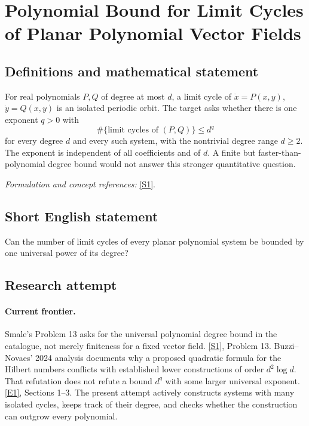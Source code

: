 \documentclass[11pt,a4paper]{article}
\newcommand{\sref}[2]{\hyperlink{source:#1:#2}{[S#2]}}
\newcommand{\eref}[2]{\hyperlink{extra:#1:#2}{[E#2]}}
\newif\ifshowcatalogue
\newcommand{\cataloguescope}[1]{\ifshowcatalogue
 \paragraph{Exact scope in the supplied catalogue.}
 \begin{quote}\small #1\end{quote}\fi}
\numberwithin{equation}{section}
\begin{document}
\setcounter{section}{0}
\setlength{\parskip}{3pt plus 1pt}
\clearpage
\section*{\texorpdfstring{Polynomial Bound for Limit Cycles of Planar Polynomial Vector Fields}{Polynomial Bound for Limit Cycles of Planar Polynomial Vector Fields}}\label{statement}
\subsection{Definitions and mathematical statement}
For real polynomials $P,Q$ of degree at most $d$, a limit cycle of $\dot x=P(x,y)$, $\dot y=Q(x,y)$ is an isolated periodic orbit. The target asks whether there is one exponent $q>0$ with
\[
 \#\{\text{limit cycles of }(P,Q)\}\le d^q
\]
for every degree $d$ and every such system, with the nontrivial degree range $d\ge2$. The exponent is independent of all coefficients and of $d$. A finite but faster-than-polynomial degree bound would not answer this stronger quantitative question.
\par\smallskip\textit{Formulation and concept references:} \sref{statement}{1}.
\cataloguescope{Determine whether the number K of limit cycles of every planar polynomial differential system of degree at most d satisfies K \ensuremath{\le} d\textasciicircum{}q for some universal exponent q.}
\subsection{Short English statement}
Can the number of limit cycles of every planar polynomial system be bounded by one universal power of its degree?
\subsection{Research attempt}

\paragraph{Current frontier.}
Smale's Problem 13 asks for the universal polynomial degree bound in the
catalogue, not merely finiteness for a fixed vector field.
\sref{statement}{1}, Problem 13.
Buzzi--Novaes' 2024 analysis documents why a proposed quadratic formula
for the Hilbert numbers conflicts with established lower constructions
of order $d^2\log d$.  That refutation does not refute a bound $d^q$
with some larger universal exponent. \eref{statement}{1}, Sections 1--3.
The present attempt actively constructs systems with many isolated
cycles, keeps track of their degree, and checks whether the construction
can outgrow every polynomial.
\end{document}

